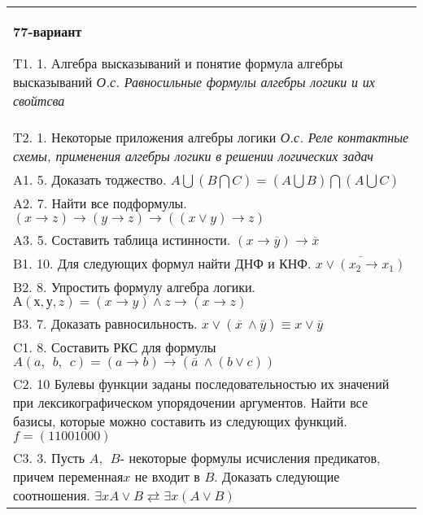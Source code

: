 \documentclass{article}
\begin{document}
\begin{tabular}{m{17cm}}
\textbf{77-вариант}
\newline

T1. 1. Алгебра высказываний и понятие формула алгебры высказываний \emph{О.с. Равносильные формулы алгебры логики и их свойтсва} \\
T2. 1. Некоторые приложения алгебры логики \emph{О.с. Реле контактные схемы, применения алгебры логики в решении логических задач} \\
A1. 5. Доказать тоджество. \(A\bigcup(B\bigcap C) = (A\bigcup B)\bigcap(A\bigcup C)\) \\
A2. 7. Найти все подформулы. \((x \rightarrow z) \rightarrow (y \rightarrow z) \rightarrow ((x \vee y) \rightarrow z)\) \\
A3. 5. Составить таблица истинности. \((x \rightarrow \overline{y}) \rightarrow \overline{x}\) \\
B1. 10. Для следующих формул найти ДНФ и КНФ. \(\overline{x \vee (x_{2} \rightarrow x_{1})}\) \\
B2. 8. Упростить формулу алгебра логики. \(А(х,у,z) = (x \rightarrow y) \land z \rightarrow (x \rightarrow z)\) \\
B3. 7. Доказать равносильность. \(x \vee \left( \overline{x\ } \land \overline{y} \right) \equiv x \vee \overline{y}\) \\
C1. 8. Составить РКС для формулы \(A(a,\ \ b,\ \ c) = (a \rightarrow b) \rightarrow (\overline{a}\  \land (b \vee c))\) \\
C2. 10 Булевы функции заданы последовательностью их значений при лексикографическом упорядочении аргументов. Найти все базисы, которые можно составить из следующих функций. \(f = (11001000)\) \\
C3. 3. Пусть \(A,\ \ B\)- некоторые формулы исчисления предикатов, причем переменная\(x\) не входит в \(B\). Доказать следующие соотношения. \(\exists xA \vee B \rightleftarrows \exists x(A \vee B)\) \\

\end{tabular}
\vspace{1cm}
\end{document}
